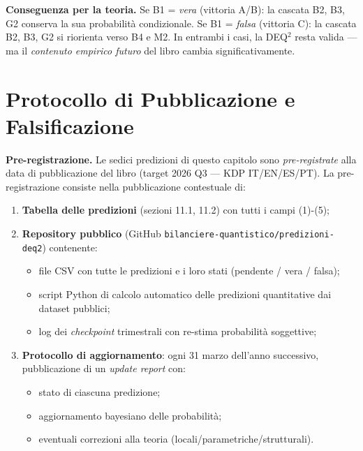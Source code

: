 \Hypoth{} \textbf{Conseguenza per la teoria.} Se B1 = \emph{vera}
(vittoria A/B): la cascata B2, B3, G2 conserva la sua probabilità
condizionale. Se B1 = \emph{falsa} (vittoria C): la cascata B2, B3, G2
si riorienta verso B4 e M2. In entrambi i casi, la DEQ$^2$ resta valida ---
ma il \emph{contenuto empirico futuro} del libro cambia
significativamente.



\section{Protocollo di Pubblicazione e
Falsificazione}\label{protocollo-di-pubblicazione-e-falsificazione}

\Hypoth{} \textbf{Pre-registrazione.} Le sedici predizioni di questo
capitolo sono \emph{pre-registrate} alla data di pubblicazione del libro
(target 2026 Q3 --- KDP IT/EN/ES/PT). La pre-registrazione consiste
nella pubblicazione contestuale di:

\begin{enumerate}
\def\labelenumi{\arabic{enumi}.}
\tightlist
\item
  \textbf{Tabella delle predizioni} (sezioni 11.1, 11.2) con tutti i
  campi (1)-(5);
\item
  \textbf{Repository pubblico} (GitHub
  \texttt{bilanciere-quantistico/predizioni-deq2}) contenente:

  \begin{itemize}
  \tightlist
  \item
    file CSV con tutte le predizioni e i loro stati (pendente / vera /
    falsa);
  \item
    script Python di calcolo automatico delle predizioni quantitative
    dai dataset pubblici;
  \item
    log dei \emph{checkpoint} trimestrali con re-stima probabilità
    soggettive;
  \end{itemize}
\item
  \textbf{Protocollo di aggiornamento}: ogni 31 marzo dell'anno
  successivo, pubblicazione di un \emph{update report} con:

  \begin{itemize}
  \tightlist
  \item
    stato di ciascuna predizione;
  \item
    aggiornamento bayesiano delle probabilità;
  \item
    eventuali correzioni alla teoria (locali/parametriche/strutturali).
  \end{itemize}
\end{enumerate}

